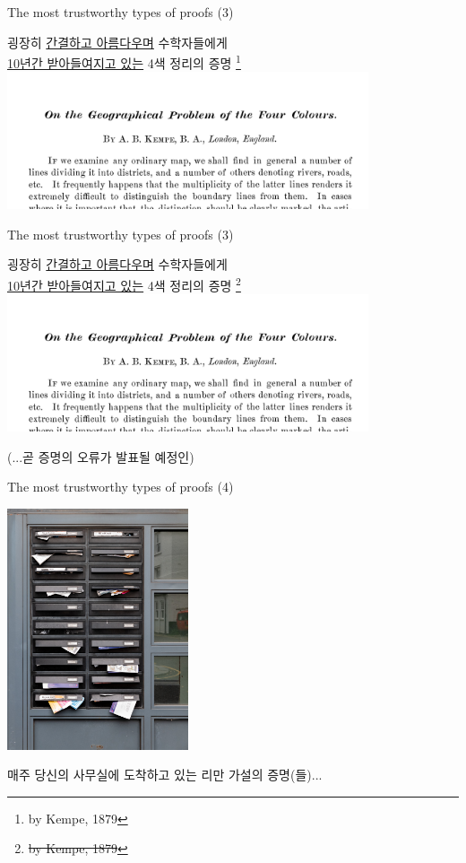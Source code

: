 \documentclass[../231120_msquare_computational-logic.tex]{subfiles}
\begin{document}
\begin{frame}{The most trustworthy types of proofs (3)}
    \begin{center}
        굉장히 \ul{간결하고 아름다우며} 수학자들에게\\ \ul{10년간 받아들여지고 있는}
        4색 정리의 증명
        \footnote{by Kempe, 1879}
        \includegraphics[width=0.8\textwidth]{./false_four_color_theorem_proof.png}
    \end{center}
\end{frame}

\begin{frame}{The most trustworthy types of proofs (3)}
    \begin{center}
        굉장히 \ul{간결하고 아름다우며} 수학자들에게\\ \ul{10년간 받아들여지고 있는}
        4색 정리의 증명
        \footnote[1]{\sout{by Kempe, 1879}}
        \includegraphics[width=0.8\textwidth]{./false_four_color_theorem_proof.png}
    \end{center}
    \begin{center}
        (...곧 증명의 오류가 발표될 예정인)
    \end{center}
\end{frame}

\begin{frame}{The most trustworthy types of proofs (4)}
    \begin{center}
        \includegraphics[width=0.4\textwidth]{./mailbox.jpg}

        매주 당신의 사무실에 도착하고 있는 리만 가설의 증명(들)...
    \end{center}
\end{frame}
\end{document}
